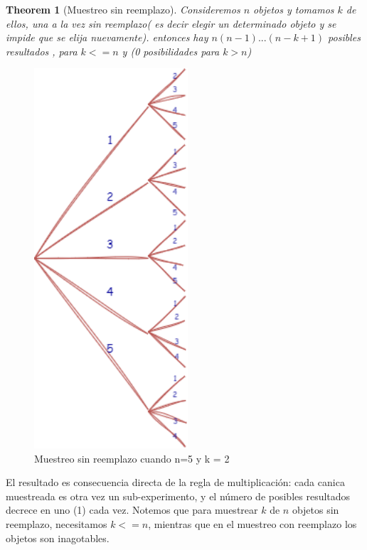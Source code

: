 \documentclass[
]{book}
\newtheorem{theorem}{Theorem}[chapter]
\theoremstyle{definition}
\theoremstyle{definition}
\theoremstyle{definition}
\theoremstyle{definition}
\theoremstyle{remark}
\begin{document}
\begin{theorem}[Muestreo sin reemplazo]
\protect\hypertarget{thm:muestreosinreemplazo}{}\label{thm:muestreosinreemplazo}Consideremos \(n\) objetos y tomamos \(k\) de ellos, una a la vez sin reemplazo( es decir elegir un determinado objeto y se impide que se elija nuevamente). entonces hay \(n(n-1) ... (n-k+1)\) posibles resultados , para \(k <= n\) y (0 posibilidades para \(k>n\))
\end{theorem}

\begin{figure}

{\centering \includegraphics[width=2.25in]{./images/muestreosinreemplazo.drawio} 

}

\caption{Muestreo sin reemplazo cuando n=5 y k = 2}\label{fig:unnamed-chunk-6}
\end{figure}

El resultado es consecuencia directa de la regla de multiplicación: cada canica muestreada es otra vez un sub-experimento, y el número de posibles resultados decrece en uno (1) cada vez. Notemos que para muestrear \(k\) de \(n\) objetos sin reemplazo, necesitamos \(k <= n\), mientras que en el muestreo con reemplazo los objetos son inagotables.
\end{document}

